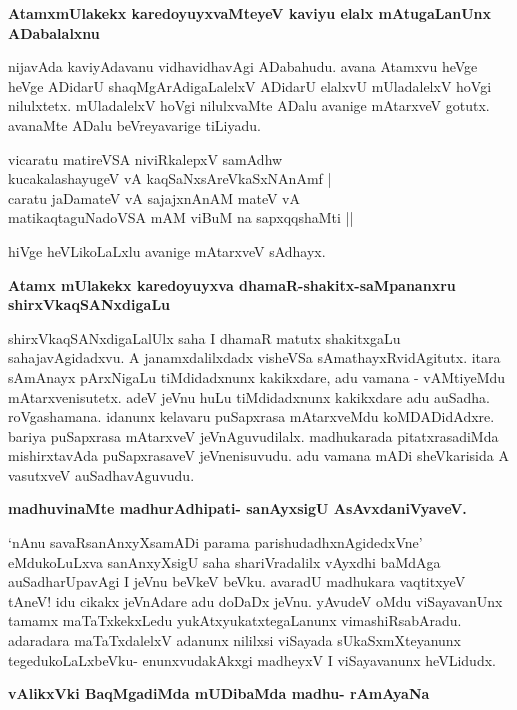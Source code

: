 {\bigskip
\noindent
{\large\bf AtamxmUlakekx karedoyuyxvaMteyeV kaviyu elalx mAtugaLanUnx ADa\break\-balalxnu}}\label{page237}
\medskip

\noindent
nijavAda kaviyAdavanu vidhavidhavAgi ADabahudu. avana Atamxvu heVge heVge ADidarU shaqMgA\-rAdigaLalelxV ADidarU elalxvU mUladalelxV hoVgi nilulxtetx. mUladalelxV hoVgi nilulxvaMte ADalu avanige mAtarxveV gotutx. avanaMte ADalu beVreyavarige tiLiyadu.

\smallskip
\begin{shloka}
vicaratu matireVSA niviRkalepxV samAdhw \\\label{237}
kucakalashayugeV vA kaqSaNxsAreVkaSxNAnAmf |\\
caratu jaDamateV vA sajajxnAnAM mateV vA \\
matikaqtaguNadoVSA mAM viBuM na sapxqqshaMti ||
\end{shloka}

\noindent
hiVge heVLikoLaLxlu avanige mAtarxveV sAdhayx.

{\bigskip
\noindent
{\large\bf Atamx mUlakekx karedoyuyxva dhamaR-shakitx-saMpananxru shirxVkaqSANxdigaLu}}\label{page237}
\medskip

\noindent
shirxVkaqSANxdigaLalUlx saha I dhamaR matutx shakitxgaLu sahajavAgidadxvu. A janamxdalilxdadx visheVSa sAmathayxR\-vidAgitutx. itara sAmAnayx pArxNigaLu tiMdidadxnunx kakikxdare, adu vamana - vAMtiyeMdu mAtarxvenisutetx. adeV jeVnu huLu tiMdidadxnunx kakikxdare adu auSadha. roVgashamana. idanunx kelavaru puSapxrasa mAtarxveMdu koMDADidAdxre. bariya puSapxrasa mAtarxveV jeVnAguvudilalx. madhukarada pitatxrasadiMda mishirxtavAda puSapx\-rasaveV jeVnenisuvudu. adu vamana mADi sheVkarisida A vasutxveV auSadhavAguvudu.

{\bigskip
\noindent
{\large\bf madhuvinaMte madhurAdhipati- sanAyxsigU AsAvxdaniVyaveV.}}\label{page238}
\medskip

\noindent
`nAnu savaRsanAnxyXsamADi parama parishudadhxnAgidedxVne' eMdukoLuLxva sanAnxyXsigU saha shariVradalilx vAyxdhi baMdAga auSadharUpavAgi I jeVnu beVkeV beVku. avaradU madhukara vaqtitxyeV tAneV! idu cikakx jeVnAdare adu doDaDx jeVnu. yAvudeV oMdu viSayavanUnx tamamx maTaTxkekxLedu yukAtxyukatxtegaLanunx vimashiRsabAradu. adaradara maTaTxdalelxV adanunx nililxsi viSayada sUkaSxmXteyanunx tegedukoLaLxbeVku- enunxvudakAkxgi madheyxV I viSayavanunx heVLidudx.

\newpage
{\noindent
{\large\bf vAlikxVki BaqMgadiMda mUDibaMda madhu- rAmAyaNa}}\label{page238}
\medskip

